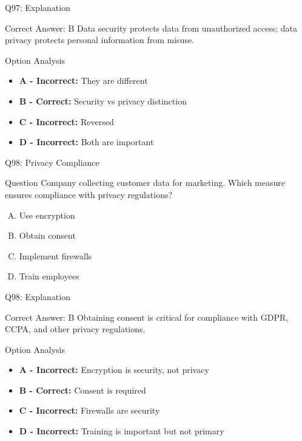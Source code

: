 \documentclass{beamer}
\begin{document}
	\begin{frame}{Q97: Explanation}
		\begin{block}{Correct Answer: B}
			Data security protects data from unauthorized access; data privacy protects personal information from misuse.
		\end{block}
		\begin{block}{Option Analysis}
			\begin{itemize}
				\item \textbf{A - Incorrect:} They are different
				\item \textbf{B - Correct:} Security vs privacy distinction
				\item \textbf{C - Incorrect:} Reversed
				\item \textbf{D - Incorrect:} Both are important
			\end{itemize}
		\end{block}
	\end{frame}
	
	\begin{frame}{Q98: Privacy Compliance}
		\begin{block}{Question}
			Company collecting customer data for marketing. Which measure ensures compliance with privacy regulations?
		\end{block}
		\begin{enumerate}[(A)]
			\item Use encryption
			\item Obtain consent
			\item Implement firewalls
			\item Train employees
		\end{enumerate}
	\end{frame}
	
	\begin{frame}{Q98: Explanation}
		\begin{block}{Correct Answer: B}
			Obtaining consent is critical for compliance with GDPR, CCPA, and other privacy regulations.
		\end{block}
		\begin{block}{Option Analysis}
			\begin{itemize}
				\item \textbf{A - Incorrect:} Encryption is security, not privacy
				\item \textbf{B - Correct:} Consent is required
				\item \textbf{C - Incorrect:} Firewalls are security
				\item \textbf{D - Incorrect:} Training is important but not primary
			\end{itemize}
		\end{block}
	\end{frame}
	
\end{document}

